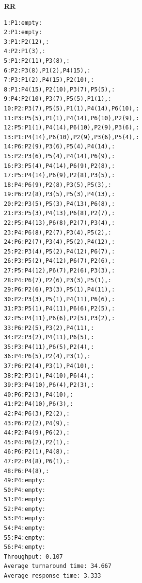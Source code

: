 \documentclass{article}
\theoremstyle{mytheoremstyle}
\theoremstyle{mytheoremstyle}
\theoremstyle{myproblemstyle}
\begin{document}
\noindent \textbf{RR}
\begin{verbatim}
1:P1:empty:
2:P1:empty:
3:P1:P2(12),:
4:P2:P1(3),:
5:P1:P2(11),P3(8),:
6:P2:P3(8),P1(2),P4(15),:
7:P3:P1(2),P4(15),P2(10),:
8:P1:P4(15),P2(10),P3(7),P5(5),:
9:P4:P2(10),P3(7),P5(5),P1(1),:
10:P2:P3(7),P5(5),P1(1),P4(14),P6(10),:
11:P3:P5(5),P1(1),P4(14),P6(10),P2(9),:
12:P5:P1(1),P4(14),P6(10),P2(9),P3(6),:
13:P1:P4(14),P6(10),P2(9),P3(6),P5(4),:
14:P6:P2(9),P3(6),P5(4),P4(14),:
15:P2:P3(6),P5(4),P4(14),P6(9),:
16:P3:P5(4),P4(14),P6(9),P2(8),:
17:P5:P4(14),P6(9),P2(8),P3(5),:
18:P4:P6(9),P2(8),P3(5),P5(3),:
19:P6:P2(8),P3(5),P5(3),P4(13),:
20:P2:P3(5),P5(3),P4(13),P6(8),:
21:P3:P5(3),P4(13),P6(8),P2(7),:
22:P5:P4(13),P6(8),P2(7),P3(4),:
23:P4:P6(8),P2(7),P3(4),P5(2),:
24:P6:P2(7),P3(4),P5(2),P4(12),:
25:P2:P3(4),P5(2),P4(12),P6(7),:
26:P3:P5(2),P4(12),P6(7),P2(6),:
27:P5:P4(12),P6(7),P2(6),P3(3),:
28:P4:P6(7),P2(6),P3(3),P5(1),:
29:P6:P2(6),P3(3),P5(1),P4(11),:
30:P2:P3(3),P5(1),P4(11),P6(6),:
31:P3:P5(1),P4(11),P6(6),P2(5),:
32:P5:P4(11),P6(6),P2(5),P3(2),:
33:P6:P2(5),P3(2),P4(11),:
34:P2:P3(2),P4(11),P6(5),:
35:P3:P4(11),P6(5),P2(4),:
36:P4:P6(5),P2(4),P3(1),:
37:P6:P2(4),P3(1),P4(10),:
38:P2:P3(1),P4(10),P6(4),:
39:P3:P4(10),P6(4),P2(3),:
40:P6:P2(3),P4(10),:
41:P2:P4(10),P6(3),:
42:P4:P6(3),P2(2),:
43:P6:P2(2),P4(9),:
44:P2:P4(9),P6(2),:
45:P4:P6(2),P2(1),:
46:P6:P2(1),P4(8),:
47:P2:P4(8),P6(1),:
48:P6:P4(8),:
49:P4:empty:
50:P4:empty:
51:P4:empty:
52:P4:empty:
53:P4:empty:
54:P4:empty:
55:P4:empty:
56:P4:empty:
Throughput: 0.107
Average turnaround time: 34.667
Average response time: 3.333
\end{verbatim}
\end{document}
